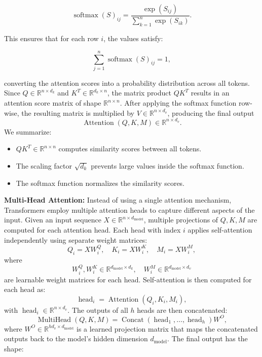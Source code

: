 \[
\operatorname{softmax}(S)_{ij} = \frac{\exp(S_{ij})}{\sum_{k=1}^{n} \exp(S_{ik})}.
\]

This ensures that for each row \( i \), the values satisfy:

\[
\sum_{j=1}^{n} \operatorname{softmax}(S)_{ij} = 1,
\]

converting the attention scores into a probability distribution across all tokens. Since \( Q \in \mathbb{R}^{n \times d_k} \) and \( K^T \in \mathbb{R}^{d_k \times n} \), the matrix product \( Q K^T \) results in an attention score matrix of shape \( \mathbb{R}^{n \times n} \). After applying the softmax function row-wise, the resulting matrix is multiplied by \( V \in \mathbb{R}^{n \times d_v} \), producing the final output
\[
\operatorname{Attention}(Q, K, M) \in \mathbb{R}^{n \times d_v}.
\]
We summarize:
\begin{itemize}
    \item \( Q K^T \in \mathbb{R}^{n \times n} \) computes similarity scores between all tokens.
    \item The scaling factor \( \sqrt{d_k} \) prevents large values inside the softmax function.
    \item The softmax function normalizes the similarity scores.
\end{itemize}

\textbf{Multi-Head Attention:} Instead of using a single attention mechanism, Transformers employ multiple attention heads to capture different aspects of the input. Given an input sequence \( X \in \mathbb{R}^{n \times d_{\text{model}}} \), multiple projections of \( Q, K, M \) are computed for each attention head. Each head with index \( i \) applies self-attention independently using separate weight matrices:
\begin{equation}
    Q_i = X W^Q_i, \quad K_i = X W^K_i, \quad M_i = X W^M_i,
\end{equation}
where
\[
W^Q_i, W^K_i \in \mathbb{R}^{d_{\text{model}} \times d_k}, \quad W^M_i \in \mathbb{R}^{d_{\text{model}} \times d_v}
\]
are learnable weight matrices for each head. Self-attention is then computed for each head as:
\begin{equation}
    \operatorname{head}_i = \operatorname{Attention}(Q_i, K_i, M_i),
\end{equation}
with \( \operatorname{head}_i \in \mathbb{R}^{n \times d_v} \). The outputs of all \( h \) heads are then concatenated:
\begin{equation}
    \operatorname{MultiHead}(Q, K, M) = \operatorname{Concat}(\operatorname{head}_1, \dots, \operatorname{head}_h) W^O,
\end{equation}
where \( W^O \in \mathbb{R}^{h d_v \times d_{\text{model}}} \) is a learned projection matrix that maps the concatenated outputs back to the model's hidden dimension \( d_{\text{model}} \). The final output has the shape:

